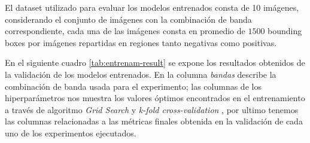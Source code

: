 El dataset utilizado para evaluar los modelos entrenados  consta de 10 imágenes, considerando el conjunto de imágenes con la combinación de banda correspondiente, cada una de las imágenes consta en promedio de $1500$ bounding boxes por imágenes repartidas en regiones tanto negativas como positivas.


En el siguiente cuadro \ref{tab:entrenam-result} se expone los resultados obtenidos de la validación de los modelos entrenados. En la columna \textit{bandas} describe la combinación de banda usada para el experimento; las columnas  de los hiperparámetros nos muestra los valores óptimos encontrados en el entrenamiento a través de algoritmo \textit{Grid Search} y \textit{k-fold cross-validation} , por ultimo tenemos las columnas relacionadas a las métricas finales obtenida en la validación de cada uno de los experimentos ejecutados.



